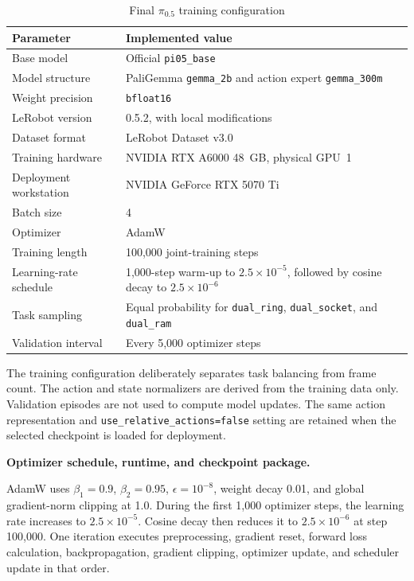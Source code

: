 \begin{table}[htbp]
  \centering
  \caption{Final $\pi_{0.5}$ training configuration}
  \label{tab:ch4-pi05-training}
  \small
  \begin{tabularx}{\textwidth}{p{}X}
    \toprule
    \textbf{Parameter} & \textbf{Implemented value} \\
    \midrule
    Base model & Official \texttt{pi05\_base} \\
    Model structure & PaliGemma \texttt{gemma\_2b} and action expert \texttt{gemma\_300m} \\
    Weight precision & \texttt{bfloat16} \\
    LeRobot version & 0.5.2, with local modifications \\
    Dataset format & LeRobot Dataset v3.0 \\
    Training hardware & NVIDIA RTX A6000 48~GB, physical GPU~1 \\
    Deployment workstation & NVIDIA GeForce RTX 5070 Ti \\
    Batch size & 4 \\
    Optimizer & AdamW \\
    Training length & 100,000 joint-training steps \\
    Learning-rate schedule & 1,000-step warm-up to \(2.5\times10^{-5}\), followed by cosine decay to \(2.5\times10^{-6}\) \\
    Task sampling & Equal probability for \texttt{dual\_ring}, \texttt{dual\_socket}, and \texttt{dual\_ram} \\
    Validation interval & Every 5,000 optimizer steps \\
    \bottomrule
  \end{tabularx}
\end{table}

The training configuration deliberately separates task balancing from frame count. The action and state normalizers are derived from the training data only. Validation episodes are not used to compute model updates. The same action representation and
\texttt{use\_relative\_actions\allowbreak=false}
setting are retained when the selected checkpoint is loaded for deployment.

\medskip
\noindent\textbf{Optimizer schedule, runtime, and checkpoint package.}

AdamW uses
\(\beta_1=0.9\), \(\beta_2=0.95\), \(\epsilon=10^{-8}\), weight decay 0.01,
and global gradient-norm clipping at 1.0. During the first 1,000 optimizer
steps, the learning rate increases to \(2.5\times10^{-5}\). Cosine decay then
reduces it to \(2.5\times10^{-6}\) at step 100,000. One iteration executes
preprocessing, gradient reset, forward loss calculation, backpropagation,
gradient clipping, optimizer update, and scheduler update in that order.

